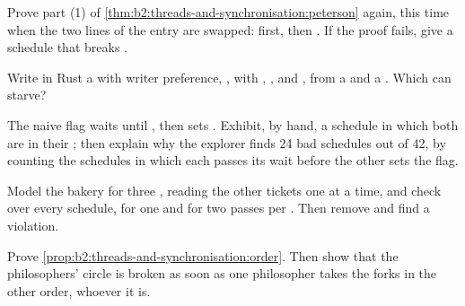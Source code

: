 \begin{exercise}[$\star\star$]\label{exo:b2:threads-and-synchronisation:8}
Prove part (1) of \cref{thm:b2:threads-and-synchronisation:peterson} again, this time when the two lines of the entry
are swapped:  first, then . If the proof fails, give a schedule that breaks .
\end{exercise}

\begin{exercise}[$\star\star$]\label{exo:b2:threads-and-synchronisation:9}
Write in Rust a  with writer preference, , with ,
,  and , from a  and a . Which 
can starve?
\end{exercise}

\begin{exercise}[$\star\star\star$]\label{exo:b2:threads-and-synchronisation:10}
The naive flag  waits until , then sets . Exhibit, by hand, a schedule in which
both  are in their ; then explain why the explorer finds 24 bad schedules out of 42, by
counting the schedules in which each  passes its wait before the other sets the flag.
\end{exercise}

\begin{exercise}[$\star\star\star$]\label{exo:b2:threads-and-synchronisation:11}
Model the bakery for three , reading the other tickets one at a time, and check  over every
schedule, for one and for two passes per . Then remove  and find a violation.
\end{exercise}

\begin{exercise}[$\star\star\star$]\label{exo:b2:threads-and-synchronisation:12}
Prove \cref{prop:b2:threads-and-synchronisation:order}. Then show that the philosophers' circle is broken as soon as
one philosopher takes the forks in the other order, whoever it is.
\end{exercise}

